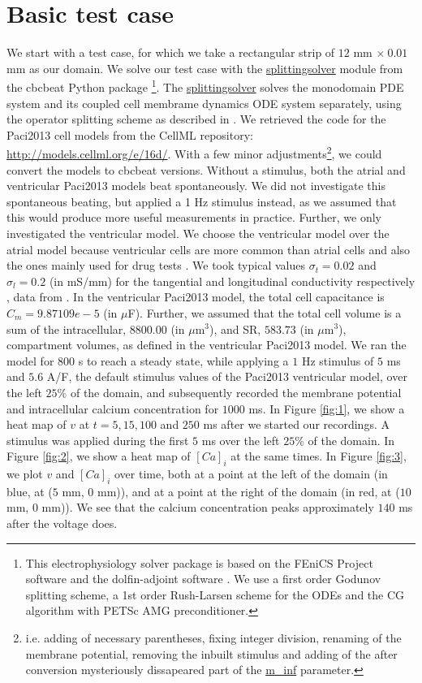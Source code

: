 \documentclass[12pt,a4paper]{article}
\begin{document}
\section{Basic test case} \label{Basic test case}
We start with a test case, for which we take a rectangular strip of $12$ mm $\times\: 0.01$ mm as our domain. We solve our test case with the \url{splittingsolver} module from the cbcbeat Python package \cite{cbcbeat}\footnote{This electrophysiology solver package is based on the FEniCS Project software \cite{fenics} and the dolfin-adjoint software \cite{dolfin-adjoint}. We use a first order Godunov splitting scheme, a 1st order Rush-Larsen scheme for the ODEs and the CG algorithm with PETSc AMG preconditioner.}. The \url{splittingsolver} solves the monodomain PDE system and its coupled cell membrame dynamics ODE system separately, using the operator splitting scheme as described in \cite{Sundnes}. We retrieved the code for the Paci2013 cell models from the CellML repository: \url{http://models.cellml.org/e/16d/}. With a few minor adjustments\footnote{i.e. adding of necessary parentheses, fixing integer division, renaming of the membrane potential, removing the inbuilt stimulus and adding of the after conversion mysteriously dissapeared part of the \url{m_inf} parameter.}, we could convert the models to cbcbeat versions. Without a stimulus, both the atrial and ventricular Paci2013 models beat spontaneously. We did not investigate this spontaneous beating, but applied a 1 Hz stimulus instead, as we assumed that this would produce more useful measurements in practice. Further, we only investigated the ventricular model. We choose the ventricular model over the atrial model because ventricular cells are more common than atrial cells and also the ones mainly used for drug tests \cite{Paci2015}. We took typical values $\sigma_t=0.02$ and $\sigma_l=0.2$ (in mS/mm) for the tangential and longitudinal conductivity respectively \cite{Roth}, data from \cite{Plonsey1882, Plonsey1984}. In the ventricular Paci2013 model, the total cell capacitance is $C_m=9.87109e-5$ (in $\mu$F). Further, we assumed that the total cell volume is a sum of the intracellular, $8800.00$ (in $\mu$m$^3$), and SR, $583.73$ (in $\mu$m$^3$), compartment volumes, as defined in the ventricular Paci2013 model.
We ran the model for 800 s to reach a steady state, while applying a $1$ Hz stimulus of $5$ ms and $5.6$ A/F, the default stimulus values of the Paci2013 ventricular model, over the left $25\%$ of the domain, and subsequently recorded the membrane potential and intracellular calcium concentration for $1000$ ms. In Figure \ref{fig:1}, we show a heat map of $v$ at $t=5, 15, 100$ and $250$ ms after we started our recordings. A stimulus was applied during the first $5$ ms over the left $25\%$ of the domain. In Figure \ref{fig:2}, we show a heat map of $[Ca]_i$ at the same times. In Figure \ref{fig:3}, we plot $v$ and $[Ca]_i$ over time, both at a point at the left of the domain (in blue, at ($5$ mm, $0$ mm)), and at a point at the right of the domain (in red, at ($10$ mm, $0$ mm)). We see that the calcium concentration peaks approximately $140$ ms after the voltage does. 
\end{document}
